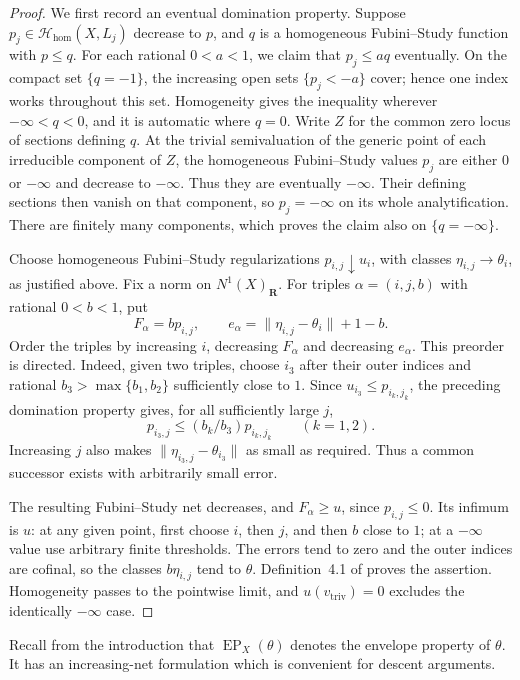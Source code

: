 \documentclass[11pt,a4paper]{article}
\newcommand{\vtriv}{v_{\mathrm{triv}}} %
\newcommand{\EP}{\operatorname{EP}}
\begin{document}
\begin{proof}
We first record an eventual domination property. Suppose $p_j\in\mathcal H_{\mathrm{hom}}(X,L_j)$ decrease to $p$, and $q$ is a homogeneous Fubini--Study function with $p\le q$. For each rational $0<a<1$, we claim that $p_j\le aq$ eventually. On the compact set $\{q=-1\}$, the increasing open sets $\{p_j<-a\}$ cover; hence one index works throughout this set. Homogeneity gives the inequality wherever $-\infty<q<0$, and it is automatic where $q=0$. Write $Z$ for the common zero locus of sections defining $q$. At the trivial semivaluation of the generic point of each irreducible component of $Z$, the homogeneous Fubini--Study values $p_j$ are either $0$ or $-\infty$ and decrease to $-\infty$. Thus they are eventually $-\infty$. Their defining sections then vanish on that component, so $p_j=-\infty$ on its whole analytification. There are finitely many components, which proves the claim also on $\{q=-\infty\}$.

Choose homogeneous Fubini--Study regularizations $p_{i,j}\downarrow u_i$, with classes $\eta_{i,j}\to\theta_i$, as justified above. Fix a norm on $N^1(X)_{\mathbf R}$. For triples $\alpha=(i,j,b)$ with rational $0<b<1$, put
\[
 F_\alpha=bp_{i,j},\qquad
 e_\alpha=\|\eta_{i,j}-\theta_i\|+1-b.
\]
Order the triples by increasing $i$, decreasing $F_\alpha$ and decreasing $e_\alpha$. This preorder is directed. Indeed, given two triples, choose $i_3$ after their outer indices and rational $b_3>\max\{b_1,b_2\}$ sufficiently close to $1$. Since $u_{i_3}\le p_{i_k,j_k}$, the preceding domination property gives, for all sufficiently large $j$,
\[
 p_{i_3,j}\le(b_k/b_3)p_{i_k,j_k}\qquad(k=1,2).
\]
Increasing $j$ also makes $\|\eta_{i_3,j}-\theta_{i_3}\|$ as small as required. Thus a common successor exists with arbitrarily small error.

The resulting Fubini--Study net decreases, and $F_\alpha\ge u$, since $p_{i,j}\le0$. Its infimum is $u$: at any given point, first choose $i$, then $j$, and then $b$ close to $1$; at a $-\infty$ value use arbitrary finite thresholds. The errors tend to zero and the outer indices are cofinal, so the classes $b\eta_{i,j}$ tend to $\theta$. Definition~4.1 of \cite{BJ22} proves the assertion. Homogeneity passes to the pointwise limit, and $u(\vtriv)=0$ excludes the identically $-\infty$ case.
\end{proof}

Recall from the introduction that $\EP_X(\theta)$ denotes the envelope property of $\theta$. It has an increasing-net formulation which is convenient for descent arguments.
\end{document}
